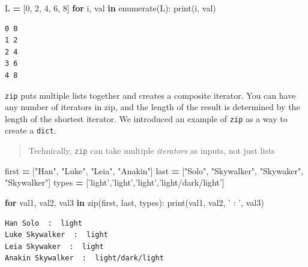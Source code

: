 \documentclass[
  letterpaper,
]{scrbook}
\newenvironment{Shaded}{\begin{snugshade}}{\end{snugshade}}
\newcommand{\BuiltInTok}[1]{#1}
\newcommand{\ControlFlowTok}[1]{\textcolor[rgb]{0.13,0.29,0.53}{\textbf{#1}}}
\newcommand{\DecValTok}[1]{\textcolor[rgb]{0.00,0.00,0.81}{#1}}
\newcommand{\KeywordTok}[1]{\textcolor[rgb]{0.13,0.29,0.53}{\textbf{#1}}}
\newcommand{\NormalTok}[1]{#1}
\newcommand{\OperatorTok}[1]{\textcolor[rgb]{0.81,0.36,0.00}{\textbf{#1}}}
\newcommand{\StringTok}[1]{\textcolor[rgb]{0.31,0.60,0.02}{#1}}
\begin{document}
\begin{Shaded}
\begin{Highlighting}[]
\NormalTok{L }\OperatorTok{=}\NormalTok{ [}\DecValTok{0}\NormalTok{, }\DecValTok{2}\NormalTok{, }\DecValTok{4}\NormalTok{, }\DecValTok{6}\NormalTok{, }\DecValTok{8}\NormalTok{]}
\ControlFlowTok{for}\NormalTok{ i, val }\KeywordTok{in} \BuiltInTok{enumerate}\NormalTok{(L):}
    \BuiltInTok{print}\NormalTok{(i, val)}
\end{Highlighting}
\end{Shaded}

\begin{verbatim}
0 0
1 2
2 4
3 6
4 8
\end{verbatim}

\texttt{zip} puts multiple lists together and creates a composite iterator. You can have any number of iterators in zip, and the length of the result is determined by the length of the shortest iterator. We introduced an example of \texttt{zip} as a way to create a \texttt{dict}.

\begin{quote}
Technically, \texttt{zip} can take multiple \emph{iterators} as inputs, not just lists
\end{quote}

\begin{Shaded}
\begin{Highlighting}[]
\NormalTok{first }\OperatorTok{=}\NormalTok{ [}\StringTok{"Han"}\NormalTok{, }\StringTok{"Luke"}\NormalTok{, }\StringTok{"Leia"}\NormalTok{, }\StringTok{"Anakin"}\NormalTok{]}
\NormalTok{last }\OperatorTok{=}\NormalTok{ [}\StringTok{"Solo"}\NormalTok{, }\StringTok{"Skywalker"}\NormalTok{, }\StringTok{"Skywaker"}\NormalTok{, }\StringTok{"Skywalker"}\NormalTok{]}
\NormalTok{types }\OperatorTok{=}\NormalTok{ [}\StringTok{'light'}\NormalTok{,}\StringTok{'light'}\NormalTok{,}\StringTok{'light'}\NormalTok{,}\StringTok{'light/dark/light'}\NormalTok{]}

\ControlFlowTok{for}\NormalTok{ val1, val2, val3 }\KeywordTok{in} \BuiltInTok{zip}\NormalTok{(first, last, types):}
    \BuiltInTok{print}\NormalTok{(val1, val2, }\StringTok{' : '}\NormalTok{, val3)}
\end{Highlighting}
\end{Shaded}

\begin{verbatim}
Han Solo  :  light
Luke Skywalker  :  light
Leia Skywaker  :  light
Anakin Skywalker  :  light/dark/light
\end{verbatim}
\end{document}
